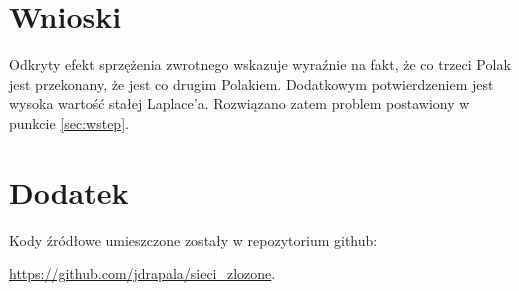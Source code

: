 \documentclass[10pt]{article}
\begin{document}
\section{Wnioski}
Odkryty efekt sprzężenia zwrotnego wskazuje wyraźnie na fakt, że co trzeci Polak jest przekonany, że jest co drugim Polakiem. Dodatkowym potwierdzeniem jest wysoka wartość stałej Laplace'a. Rozwiązano zatem problem postawiony w punkcie \ref{sec:wstep}.


\appendix
\section{Dodatek}
Kody źródłowe umieszczone zostały w repozytorium github:

\noindent \url{https://github.com/jdrapala/sieci_zlozone}.
\end{document}
